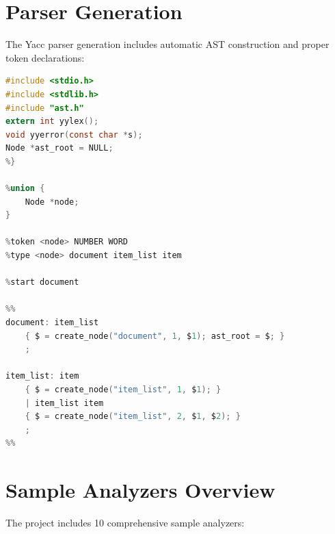 \documentclass[a4paper,12pt]{report}
\begin{document}
\newpage

\section{Parser Generation}
The Yacc parser generation includes automatic AST construction and proper token declarations:

\begin{lstlisting}[language=C, caption=Generated Parser Structure, label=lst:generated_parser]
%{
#include <stdio.h>
#include <stdlib.h>
#include "ast.h"
extern int yylex();
void yyerror(const char *s);
Node *ast_root = NULL;
%}

%union {
    Node *node;
}

%token <node> NUMBER WORD
%type <node> document item_list item

%start document

%%
document: item_list
    { $ = create_node("document", 1, $1); ast_root = $; }
    ;

item_list: item
    { $ = create_node("item_list", 1, $1); }
    | item_list item
    { $ = create_node("item_list", 2, $1, $2); }
    ;
%%
\end{lstlisting}

\newpage

\section{Sample Analyzers Overview}
The project includes 10 comprehensive sample analyzers:
\end{document}
